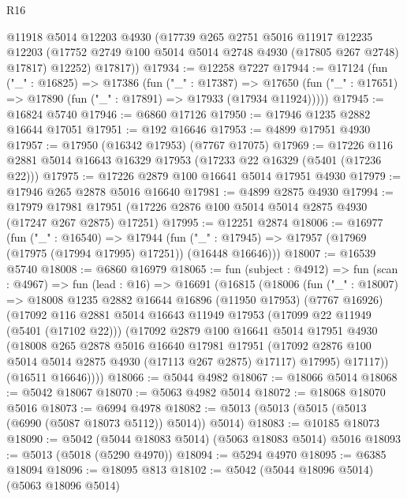 \begin{lexlean}{R16}
\begin{coremodule}
        @11918
        @5014
        @12203
        @4930
        (@17739
          @265
          @2751
          @5016
          @11917
          @12235
          @12203
          (@17752 @2749 @100 @5014 @5014 @2748 @4930 (@17805 @267 @2748) @17817)
          @12252)
        @17817))
@17934 := @12258 @7227
@17944 := @17124
    (fun ("_" : @16825) =>
    @17386
      (fun ("_" : @17387) =>
      @17650 (fun ("_" : @17651) => @17890 (fun ("_" : @17891) => @17933 (@17934 @11924)))))
@17945 := @16824 @5740
@17946 := @6860 @17126
@17950 := @17946 @1235 @2882 @16644 @17051
@17951 := @192 @16646
@17953 := @4899 @17951 @4930
@17957 := @17950 (@16342 @17953) (@7767 @17075)
@17969 := @17226 @116 @2881 @5014 @16643 @16329 @17953 (@17233 @22 @16329 (@5401 (@17236 @22)))
@17975 := @17226 @2879 @100 @16641 @5014 @17951 @4930
@17979 := @17946 @265 @2878 @5016 @16640
@17981 := @4899 @2875 @4930
@17994 := @17979
    @17981
    @17951
    (@17226 @2876 @100 @5014 @5014 @2875 @4930 (@17247 @267 @2875) @17251)
@17995 := @12251 @2874
@18006 := @16977
    (fun ("_" : @16540) =>
    @17944 (fun ("_" : @17945) => @17957 (@17969 (@17975 (@17994 @17995) @17251)) (@16448 @16646)))
@18007 := @16539 @5740
@18008 := @6860 @16979
@18065 := fun (subject : @4912) =>
  fun (scan : @4967) =>
  fun (lead : @16) =>
  @16691
    (@16815
      (@18006
        (fun ("_" : @18007) =>
        @18008
          @1235
          @2882
          @16644
          @16896
          (@11950 @17953)
          (@7767 @16926)
          (@17092
            @116
            @2881
            @5014
            @16643
            @11949
            @17953
            (@17099 @22 @11949 (@5401 (@17102 @22)))
            (@17092
              @2879
              @100
              @16641
              @5014
              @17951
              @4930
              (@18008
                @265
                @2878
                @5016
                @16640
                @17981
                @17951
                (@17092 @2876 @100 @5014 @5014 @2875 @4930 (@17113 @267 @2875) @17117)
                @17995)
              @17117))
          (@16511 @16646))))
@18066 := @5044 @4982
@18067 := @18066 @5014
@18068 := @5042 @18067
@18070 := @5063 @4982 @5014
@18072 := @18068 @18070 @5016
@18073 := @6994 @4978
@18082 := @5013 (@5013 (@5015 (@5013 (@6990 (@5087 @18073 @5112)) @5014)) @5014)
@18083 := @10185 @18073
@18090 := @5042 (@5044 @18083 @5014) (@5063 @18083 @5014) @5016
@18093 := @5013 (@5018 (@5290 @4970))
@18094 := @5294 @4970
@18095 := @6385 @18094
@18096 := @18095 @813
@18102 := @5042 (@5044 @18096 @5014) (@5063 @18096 @5014)

\end{coremodule}
\end{lexlean}
